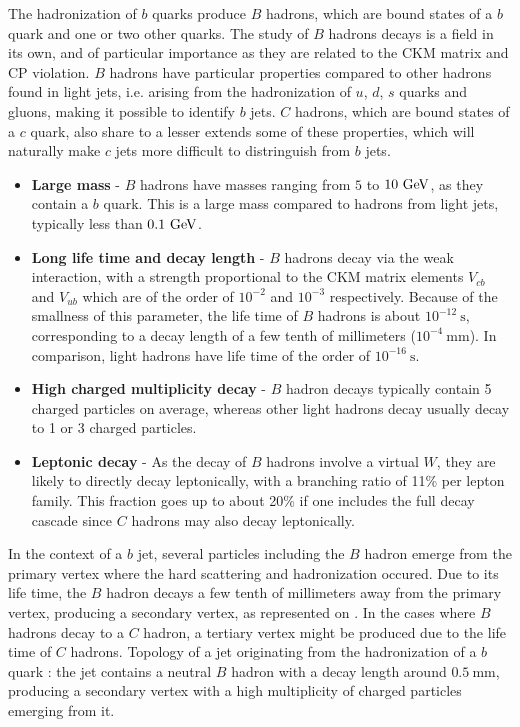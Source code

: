     The hadronization of $b$ quarks produce $B$ hadrons, which are bound states of
    a $b$ quark and one or two other quarks. The study of $B$ hadrons decays is
    a field in its own, and of particular importance as they are related to the CKM matrix
    and CP violation. $B$ hadrons have particular properties compared to other hadrons
    found in light jets, i.e. arising from the hadronization of $u$, $d$, $s$ quarks and
    gluons, making it possible to identify $b$ jets. $C$ hadrons, which are bound states
    of a $c$ quark, also share to a lesser extends some of these properties, which will
    naturally make $c$ jets more difficult to distringuish from $b$ jets.
    \begin{itemize}
        \item \textbf{Large mass} - $B$ hadrons have masses ranging from $5$ to $10 ~\text{GeV}$, as
              they contain a $b$ quark. This is a large mass compared to hadrons from
              light jets, typically less than $0.1 ~\text{GeV}$.
        \item \textbf{Long life time and decay length} - $B$ hadrons decay via the weak
              interaction, with a strength proportional to the CKM matrix elements $V_{cb}$ and $V_{ub}$
              which are of the order of $10^{-2}$ and $10^{-3}$ respectively. Because of
              the smallness of this parameter, the life time of $B$ hadrons is about
              $10^{-12}~\text{s}$, corresponding to a decay length of a few tenth of millimeters
              ($10^{-4}~\text{mm}$). In comparison, light hadrons have life time of the order
              of $10^{-16}~\text{s}$.
        \item \textbf{High charged multiplicity decay} - $B$ hadron decays typically
              contain 5 charged particles on average, whereas other light hadrons decay
              usually decay to 1 or 3 charged particles.
        \item \textbf{Leptonic decay} - As the decay of $B$ hadrons involve a virtual $W$,
              they are likely to directly decay leptonically, with a branching ratio of
              11\% per lepton family. This fraction goes up to about 20\% if one
              includes the full decay cascade since $C$ hadrons may also decay leptonically.
    \end{itemize}

    In the context of a $b$ jet, several particles including the $B$ hadron emerge from
    the primary vertex where the hard scattering and hadronization occured. Due to its
    life time, the $B$ hadron decays a few tenth of millimeters away from the primary
    vertex, producing a secondary vertex, as represented on .
    In the cases where $B$ hadrons decay to a $C$ hadron, a tertiary vertex might
    be produced due to the life time of $C$ hadrons.
                 {Topology of a jet originating from the hadronization of a $b$ quark : the
                 jet contains a neutral $B$ hadron with a decay length around $0.5~\text{mm}$,
                 producing a secondary vertex with a high multiplicity of charged particles
                 emerging from it.}

